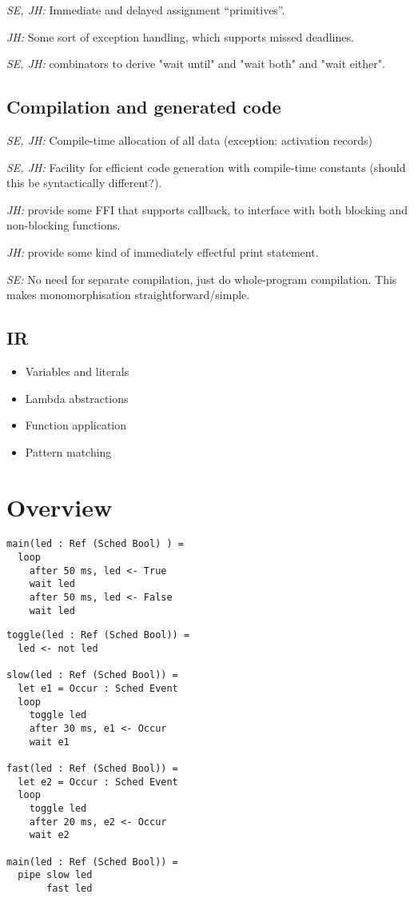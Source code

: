 \documentclass{article}
\begin{document}
\textit{SE, JH:} Immediate and delayed assignment ``primitives''.

\textit{JH:} Some sort of exception handling, which supports missed deadlines.

\textit{SE, JH:} combinators to derive "wait until" and "wait both" and "wait either".

\subsection{Compilation and generated code}

\textit{SE, JH:} Compile-time allocation of all data (exception: activation records)

\textit{SE, JH:} Facility for efficient code generation with compile-time
constants (should this be syntactically different?).

\textit{JH:} provide some FFI that supports callback, to interface with both
blocking and non-blocking functions.

\textit{JH:} provide some kind of immediately effectful print statement.

\textit{SE:} No need for separate compilation, just do whole-program
compilation. This makes monomorphisation straightforward/simple.

\subsection{IR}

\begin{itemize}
\item Variables and literals
\item Lambda abstractions
\item Function application
\item Pattern matching
\end{itemize}

\section{Overview}

\begin{lstlisting}
main(led : Ref (Sched Bool) ) =
  loop
    after 50 ms, led <- True
    wait led
    after 50 ms, led <- False
    wait led
\end{lstlisting}

\begin{lstlisting}
toggle(led : Ref (Sched Bool)) =
  led <- not led

slow(led : Ref (Sched Bool)) =
  let e1 = Occur : Sched Event
  loop
    toggle led
    after 30 ms, e1 <- Occur
    wait e1

fast(led : Ref (Sched Bool)) =
  let e2 = Occur : Sched Event
  loop
    toggle led
    after 20 ms, e2 <- Occur
    wait e2
    
main(led : Ref (Sched Bool)) =
  pipe slow led
       fast led
\end{lstlisting}
\end{document}
